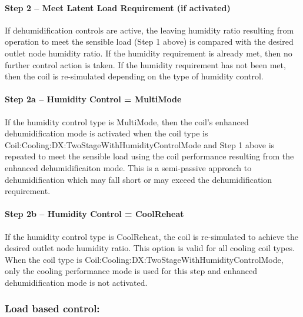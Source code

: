 \paragraph{Step 2 -- Meet Latent Load Requirement (if activated)}\label{step-2-meet-latent-load-requirement-if-activated}

If dehumidification controls are active, the leaving humidity ratio resulting from operation to meet the sensible load (Step 1 above) is compared with the desired outlet node humidity ratio. If the humidity requirement is already met, then no further control action is taken. If the humidity requirement has not been met, then the coil is re-simulated depending on the type of humidity control.

\paragraph{Step 2a -- Humidity Control = MultiMode}\label{step-2a-humidity-control-multimode}

If the humidity control type is MultiMode, then the coil's enhanced dehumidification mode is activated when the coil type is Coil:Cooling:DX:TwoStageWithHumidityControlMode and Step 1 above is repeated to meet the sensible load using the coil performance resulting from the enhanced dehumidificaiton mode. This is a semi-passive approach to dehumidification which may fall short or may exceed the dehumidification requirement.

\paragraph{Step 2b -- Humidity Control = CoolReheat}\label{step-2b-humidity-control-coolreheat}

If the humidity control type is CoolReheat, the coil is re-simulated to achieve the desired outlet node humidity ratio. This option is valid for all cooling coil types. When the coil type is Coil:Cooling:DX:TwoStageWithHumidityControlMode, only the cooling performance mode is used for this step and enhanced dehumidification mode is not activated.

\subsubsection{Load based control:}\label{load-based-control}

